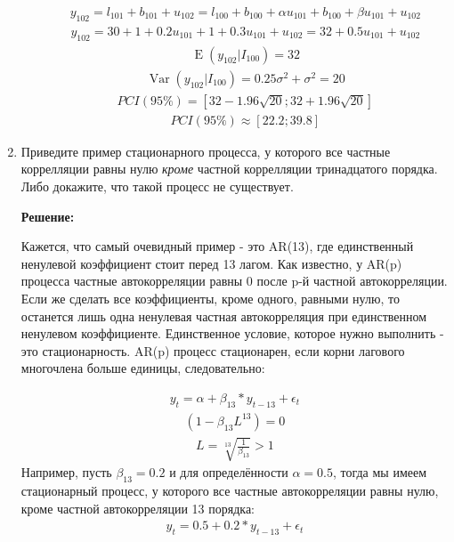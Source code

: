 \documentclass[a4paper,14pt]{article}
\DeclareMathOperator{\Var}{Var}
\DeclareMathOperator{\E}{E}
\def \s{\sigma}
\begin{document}
\begin{enumerate}
\begin{enumerate}
   \[\begin{aligned}
y_{102} = l_{101} + b_{101} + u_{102} = l_{100} + b_{100} + \alpha u_{101} + b_{100} + \beta u_{101} + u_{102}
	\end{aligned}\]
    \[\begin{aligned}
y_{102} = 30+1+0.2 u_{101} + 1 + 0.3 u_{101} + u_{102} = 32 + 0.5u_{101} + u_{102}
	\end{aligned}\]
   \[\begin{aligned}
\E(y_{102}|I_{100}) = 32 
	\end{aligned}\]
    \[\begin{aligned}
\Var(y_{102}|I_{100}) = 0.25\s^2 + \s^2 = 20
	\end{aligned}\]
  \[\begin{aligned}
PCI(95\%) = [ 32 - 1.96\sqrt{20}; 32+ 1.96\sqrt{20}]
	\end{aligned}\]
   \[\begin{aligned}
PCI(95\%) \approx [ 22.2; 39.8]
	\end{aligned}\]

 
\end{enumerate}


\item Приведите пример стационарного процесса, 
у которого все частные коррелляции равны нулю \textit{кроме} частной коррелляции тринадцатого порядка.
Либо докажите, что такой процесс не существует. 

{\bf Решение:}

Кажется, что самый очевидный пример - это AR(13), где единственный ненулевой коэффициент стоит перед 13 лагом. Как известно, у AR(p) процесса частные автокорреляции равны 0 после p-й частной автокорреляции. Если же сделать все коэффициенты, кроме одного, равными нулю, то останется лишь одна ненулевая частная автокорреляция при единственном ненулевом коэффициенте. Единственное условие, которое нужно выполнить - это стационарность. AR(p) процесс стационарен, если корни лагового многочлена больше единицы, следовательно:

  \[\begin{aligned}
y_{t} = \alpha + \beta_{13}*y_{t-13} + \epsilon_t
	\end{aligned}\]
   \[\begin{aligned}
(1-\beta_{13}L^{13}) = 0
	\end{aligned}\]
    \[\begin{aligned}
L =  \sqrt[13]{\frac{1}{\beta_{13}}} > 1
	\end{aligned}\]
Например, пусть $\beta_{13} = 0.2$ и для определённости $\alpha = 0.5$, тогда мы имеем стационарный процесс, у которого все частные автокорреляции равны нулю, кроме частной автокорреляции 13 порядка:
  \[\begin{aligned}
y_{t} = 0.5 + 0.2*y_{t-13} + \epsilon_t
	\end{aligned}\]


\end{enumerate}
\end{document}
